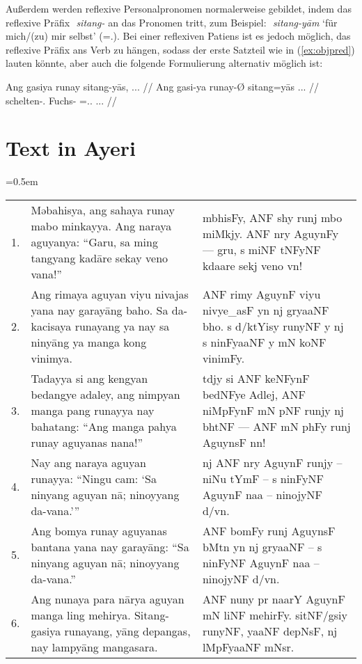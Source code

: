\documentclass[12pt,paper=a4]{scrartcl}
\newcommand{\TsgM}{{\Tsg}.{\M}}
\newcommand{\zwsp}{\mbox{​}} %
\newcommand{\rayr}[2]{\zwsp\smash{{\Tagati #1}} \emph{#2}} %
\newcommand{\xayr}[3]{\zwsp\smash{\Tagati #1} \emph{#2} `#3'} %
\begin{document}
Außerdem werden reflexive Personalpronomen normalerweise gebildet, indem das reflexive Präfix \rayr{sitNF/}{sitang-} an das Pronomen tritt, zum Beispiel: \xayr{sitNF/yaamF}{sitang-yām}{für mich/(zu) mir selbst} (\Refl{}=\Fsg{}.\Dat{}). Bei einer reflexiven Patiens ist es jedoch möglich, das reflexive Präfix ans Verb zu hängen, sodass der erste Satzteil wie in (\ref{ex:objpred}) lauten könnte, aber auch die folgende Formulierung alternativ möglich ist:

\exdisplay[everygl=\hspace*{1em}]\noexno
\begingl
	\gla Ang gasiya runay sitang-yās, ... //
	\glb Ang gasi-ya runay-Ø sitang=yās ... //
	\glc \AgtT{} schelten-\TsgM{} Fuchs-\Top{} \Refl{}=\TsgM{}.\Parg{} ... //
\endgl
\xe

\section{Text in Ayeri}

\tabulinesep=0.5em
\begin{longtabu} to \linewidth {X[1r] X[12] X[12l]}

1.
	& Məbahisya, ang sahaya runay mabo minkayya. Ang naraya aguyanya: \enquote{Garu, sa ming tangyang kadāre sekay veno vana!}
	& {\Tagati mbhisFy, ANF shy runj mbo miMkjy. ANF nry AguynFy — gru, s miNF tNFyNF kdaare sekj veno vn!}
	\\
	
2.
	& Ang rimaya aguyan viyu nivajas yana nay garayāng baho. Sa da-kacisaya runayang ya nay sa ninyāng ya manga kong vi\-nim\-ya.
	& {\Tagati ANF rimy AguynF viyu nivye\_asF yn nj gryaaNF bho. s d/ktYisy runyNF y nj s ninFyaaNF y mN koNF vinimFy.}
	\\
	
3.
	& Tadayya si ang kengyan bedangye adaley, ang nimpyan manga pang runayya nay bahatang: \enquote{Ang manga pahya runay aguyanas nana!}
	& {\Tagati tdjy si ANF keNFynF bedNFye Adlej, ANF niMpFynF mN pNF runjy nj bhtNF — ANF mN phFy runj AguynsF nn!}
	\\
	
4.
	& Nay ang naraya aguyan runayya: \enquote{Ningu cam: \enquote{Sa ninyang aguyan nā; ninoyyang da-vana.}}
	& {\Tagati nj ANF nry AguynF runjy – niNu tYmF – s ninFyNF AguynF naa – ninojyNF d/vn.}
	\\
	
5.
	& Ang bomya runay aguyanas bantana yana nay garayāng: \enquote{Sa ninyang aguyan nā; ninoyyang da-vana.}
	& {\Tagati ANF bomFy runj AguynsF bMtn yn nj gryaaNF – s ninFyNF AguynF naa – ninojyNF d/vn.}
	\\
	
6.
	& Ang nunaya para nārya aguyan manga ling mehirya. Sitang-gasiya runayang, yāng depangas, nay lampyāng mangasara.
	& {\Tagati ANF nuny pr naarY AguynF mN liNF mehirFy. sitNF/gsiy runyNF, yaaNF depNsF, nj lMpFyaaNF mNsr.}
	\\

\end{longtabu}


\clearpage

\begin{multicols}{3}%
\printglossary[style=mysuper,type=\leipzigtype]
\end{multicols}

\printbibliography[heading=none]
\end{document}

